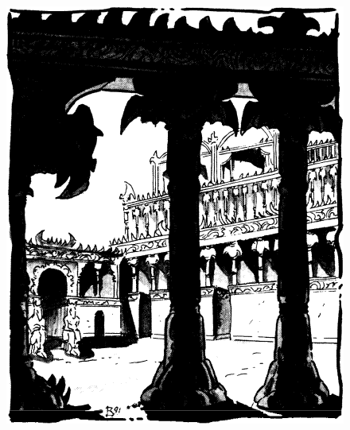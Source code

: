 \begin{figure}[b!]
\centering
\includegraphics[width=\columnwidth]{images/nibenay-1.png}
\WOTC
\end{figure}

